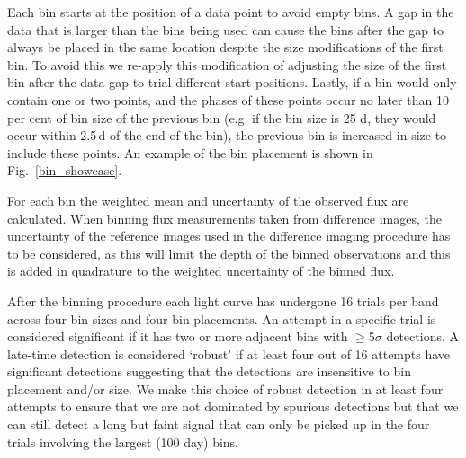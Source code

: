 \documentclass[a4paper,oneside,12pt, class=Latex/Classes/PhDthesisPSnPDF, crop=false]{standalone}
\begin{document}
Each bin starts at the position of a data point to avoid empty bins. A gap in the data that is larger than the bins being used can cause the bins after the gap to always be placed in the same location despite the size modifications of the first bin. To avoid this we re-apply this modification of adjusting the size of the first bin after the data gap to trial different start positions. Lastly, if a bin would only contain one or two points, and the phases of these points occur no later than 10 per cent of bin size of the previous bin (e.g. if the bin size is 25 d, they would occur within 2.5\,d of the end of the bin), the previous bin is increased in size to include these points. An example of the bin placement is shown in Fig.~\ref{bin_showcase}.

For each bin the weighted mean and uncertainty of the observed flux are calculated. When binning flux measurements taken from difference images, the uncertainty of the reference images used in the difference imaging procedure has to be considered, as this will limit the depth of the binned observations \citep{ref_uncert} and this is added in quadrature to the weighted uncertainty of the binned flux. 

After the binning procedure each light curve has undergone 16 trials per band across four bin sizes and four bin placements. An attempt in a specific trial is considered significant if it has two or more adjacent bins with $\ge$5$\sigma$ detections. A late-time detection is considered `robust' if at least four out of 16 attempts have significant detections suggesting that the detections are insensitive to bin placement and/or size. We make this choice of robust detection in at least four attempts to ensure that we are not dominated by spurious detections but that we can still detect a long but faint signal that can only be picked up in the four trials involving the largest (100 day) bins. 
\end{document}
